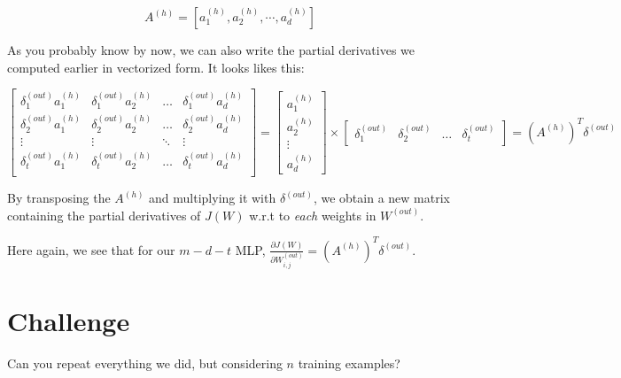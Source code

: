 \documentclass[12pt, letterpaper]{article}
\begin{document}
\[
    A^{(h)} = [a_1^{(h)}, a_2^{(h)}, \cdots, a_d^{(h)}]
\]

As you probably know by now, we can also write the partial derivatives
we computed earlier in vectorized form. It looks likes this:

\[
    \begin{bmatrix}
        \delta_1^{(out)} a_1^{(h)} & \delta_1^{(out)} a_2^{(h)} & \dots     & \delta_1^{(out)} a_d^{(h)}\\
        \delta_2^{(out)} a_1^{(h)} & \delta_2^{(out)} a_2^{(h)} & \dots     & \delta_2^{(out)} a_d^{(h)}\\
        \vdots                     & \vdots                     & \ddots    & \vdots                    \\
        \delta_t^{(out)} a_1^{(h)} & \delta_t^{(out)} a_2^{(h)} & \dots     & \delta_t^{(out)} a_d^{(h)}\\
    \end{bmatrix}
    =
    \begin{bmatrix}
        a_1^{(h)} \\
        a_2^{(h)} \\
        \vdots \\
        a_d^{(h)}
    \end{bmatrix}
    \times
    \begin{bmatrix}
        \delta_1^{(out)} & \delta_2^{(out)} & \dots & \delta_t^{(out)}
    \end{bmatrix}
    = 
    (A^{(h)})^{T} \delta^{(out)}
\]

By transposing the $A^{(h)}$ and multiplying it with
$\delta^{(out)}$, we obtain a new matrix containing the partial
derivatives of $J(W)$ w.r.t to \emph{each} weights in $W^{(out)}$.

\vspace{5mm} %

Here again, we see that for our $m-d-t$ MLP, $\frac{\partial J(W)}
{\partial W_{i,j}^{(out)}} = (A^{(h)})^{T} \delta^{(out)}$.

\section{Challenge}

Can you repeat everything we did, but considering $n$ training
examples?
\end{document}

